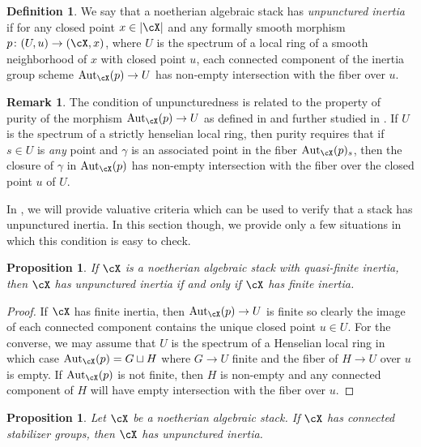 \documentclass[a4paper]{amsart}
\numberwithin{equation}{section}
\theoremstyle{plain}
\newtheorem{prop}[thm]{Proposition}
\theoremstyle{definition}
\newtheorem{remark}[thm]{Remark}
\newtheorem{defn}[thm]{Definition}
\DeclareMathOperator{\Aut}{Aut}
\newcommand{\co}{\colon}
\newcommand{\spref}[1]{\href{http://stacks.math.columbia.edu/tag/#1}{Tag #1}}
\begin{document}
\begin{defn} \label{D:unpunctured}
	We say that a noetherian algebraic stack has \emph{unpunctured inertia} if for any closed point $x \in |\cX|$ and any {formally} smooth morphism $p \co (U,u) \to (\cX, x)$, where $U$ is the spectrum of a local ring {of a smooth neighborhood of $x$} with closed point $u$, each connected component of the inertia group scheme $\Aut_{\cX}(p) \to U$ has non-empty intersection with the fiber over $u$.
\end{defn}

\begin{remark}
The condition of unpuncturedness is related to the property of purity of the morphism $\Aut_{\cX}(p) \to U$ as defined in \cite[\S 3.3]{raynaud-gruson} and further studied in \cite[\spref{0CV5}]{stacks-project}.  If $U$ is the spectrum of a strictly henselian local ring, then purity requires that if $s \in U$ is {\it any} point and $\gamma$ is an associated point in the fiber $\Aut_{\cX}(p)_s$, then the closure of $\gamma$ in $\Aut_{\cX}(p)$ has non-empty intersection with the fiber over the closed point $u$ of $U$.
\end{remark}

In , we will provide valuative criteria which can be used to verify that a stack has unpunctured inertia.
In this section though, we provide only a few situations in which this condition is easy to check. 

\begin{prop} \label{P:quasi-finite-unpunctured}
	If $\cX$ is a noetherian algebraic stack with quasi-finite inertia, then $\cX$ has unpunctured inertia if and only if $\cX$ has finite inertia.  
\end{prop}

\begin{proof}
	If $\cX$ has finite inertia, then $\Aut_{\cX}(p) \to U$ is finite so clearly the image of each connected component contains the unique closed point $u \in U$.  For the converse, we may assume that $U$ is the spectrum of a Henselian local ring in which case $\Aut_{\cX}(p) = G \sqcup H$ where $G \to U$ finite and the fiber of $H \to U$ over $u$ is empty.  If $\Aut_{\cX}(p)$ is not finite, then $H$ is non-empty and any connected component of $H$ will have empty intersection with the fiber over $u$.
\end{proof}


\begin{prop} \label{P:connected-unpunctured}
	Let $\cX$ be a noetherian algebraic stack.  If $\cX$ has connected stabilizer groups, then $\cX$ has unpunctured inertia.
\end{prop}
\end{document}
